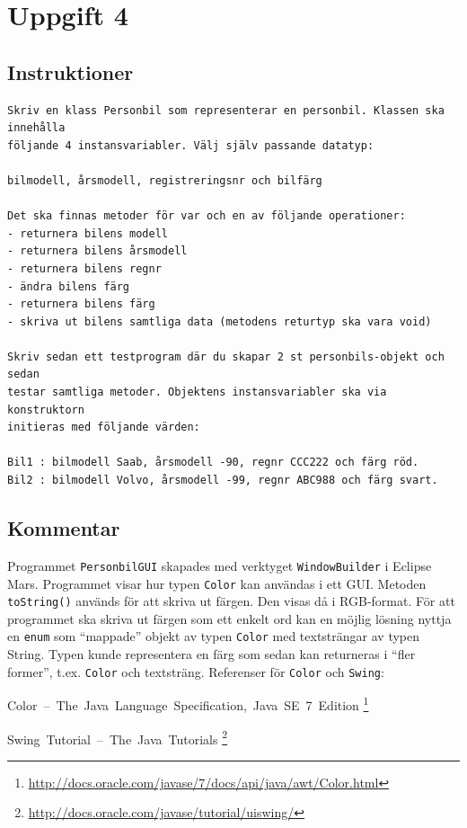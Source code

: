 \section{Uppgift 4}\label{sec:uppg04}

\subsection{Instruktioner}
\begin{Verbatim}[fontsize=\small]
Skriv en klass Personbil som representerar en personbil. Klassen ska innehålla
följande 4 instansvariabler. Välj själv passande datatyp:

bilmodell, årsmodell, registreringsnr och bilfärg

Det ska finnas metoder för var och en av följande operationer:
- returnera bilens modell
- returnera bilens årsmodell
- returnera bilens regnr
- ändra bilens färg
- returnera bilens färg
- skriva ut bilens samtliga data (metodens returtyp ska vara void)

Skriv sedan ett testprogram där du skapar 2 st personbils-objekt och sedan
testar samtliga metoder. Objektens instansvariabler ska via konstruktorn
initieras med följande värden:

Bil1 : bilmodell Saab, årsmodell -90, regnr CCC222 och färg röd.
Bil2 : bilmodell Volvo, årsmodell -99, regnr ABC988 och färg svart.
\end{Verbatim}


\subsection{Kommentar}
Programmet \texttt{PersonbilGUI} skapades med verktyget \texttt{WindowBuilder}
i Eclipse Mars. Programmet visar hur typen \texttt{Color} kan användas i ett
GUI.  Metoden \texttt{toString()} används för att skriva ut färgen. Den visas
då i RGB-format. För att programmet ska skriva ut färgen som ett enkelt ord kan
en möjlig lösning nyttja en \texttt{enum} som ``mappade'' objekt av typen
\texttt{Color} med textsträngar av typen String. Typen kunde representera en
färg som sedan kan returneras i ``fler former'', t.ex. \texttt{Color} och
textsträng.
Referenser för \texttt{Color} och \texttt{Swing}:

\mbox{Color -- The Java Language Specification, Java SE 7 Edition}
\footnote{\url{http://docs.oracle.com/javase/7/docs/api/java/awt/Color.html}}

\mbox{Swing Tutorial -- The Java Tutorials}
\footnote{\url{http://docs.oracle.com/javase/tutorial/uiswing/}}


